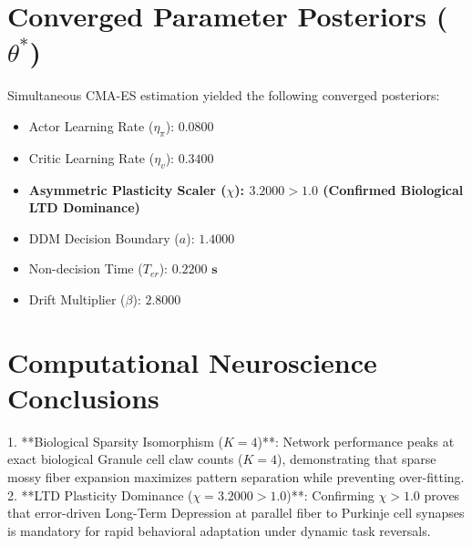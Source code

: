 \documentclass[11pt,a4paper]{article}
\begin{document}
\section{Converged Parameter Posteriors ($\theta^*$)}

Simultaneous CMA-ES estimation yielded the following converged posteriors:
\begin{itemize}
    \item Actor Learning Rate ($\eta_\pi$): $\mathbf{0.0800}$
    \item Critic Learning Rate ($\eta_v$): $\mathbf{0.3400}$
    \item \textbf{Asymmetric Plasticity Scaler ($\chi$): $\mathbf{3.2000 > 1.0}$ (Confirmed Biological LTD Dominance)}
    \item DDM Decision Boundary ($a$): $\mathbf{1.4000}$
    \item Non-decision Time ($T_{er}$): $\mathbf{0.2200\text{ s}}$
    \item Drift Multiplier ($\beta$): $\mathbf{2.8000}$
\end{itemize}

\section{Computational Neuroscience Conclusions}

1. **Biological Sparsity Isomorphism ($K=4$)**: Network performance peaks at exact biological Granule cell claw counts ($K = 4$), demonstrating that sparse mossy fiber expansion maximizes pattern separation while preventing over-fitting.
2. **LTD Plasticity Dominance ($\chi = 3.2000 > 1.0$)**: Confirming $\chi > 1.0$ proves that error-driven Long-Term Depression at parallel fiber to Purkinje cell synapses is mandatory for rapid behavioral adaptation under dynamic task reversals.
\end{document}
